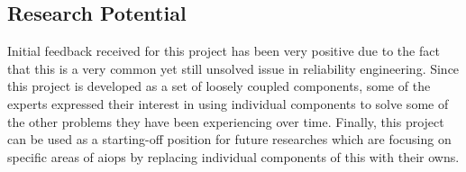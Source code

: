 \subsection{Research Potential}

Initial feedback received for this project has been very positive due to the fact that this is a very common yet still unsolved issue in reliability engineering. Since this project is developed as a set of loosely coupled components, some of the experts expressed their interest in using individual components to solve some of the other problems they have been experiencing over time. Finally, this project can be used as a starting-off position for future researches which are focusing on specific areas of \ac{aiops} by replacing individual components of this with their owns.